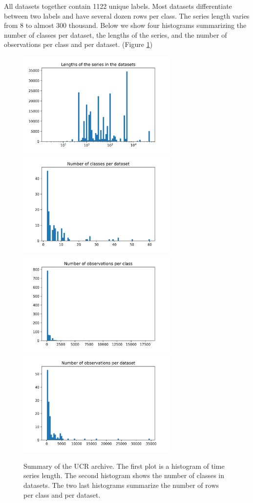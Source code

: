\documentclass[a4paper,11pt,twoside]{report}
\theoremstyle{definition}
\begin{document}
All datasets together contain 1122 unique labels. Most datasets differentiate between two labels and have several dozen rows per class. The series length varies from 8 to almost 300 thousand. Below we show four histograms summarizing the number of classes per dataset, the lengths of the series, and the number of observations per class and per dataset. (Figure \ref{fig:histograms})
\begin{figure}[h!]
\centering
\includegraphics[width=7.9cm]{imgs/lengths_of_the_series_in_the_datasets.png}
\includegraphics[width=7.9cm]{imgs/number_of_classes_per_dataset.png}
\includegraphics[width=7.9cm]{imgs/number_of_observations_per_class.png}
\includegraphics[width=7.9cm]{imgs/number_of_observations_per_dataset.png}
\caption{Summary of the UCR archive. The first plot is a histogram of time series length. The second histogram shows the number of classes in datasets. The two last histograms summarize the number of rows per class and per dataset.}
\label{fig:histograms}
\end{figure}
\end{document}
